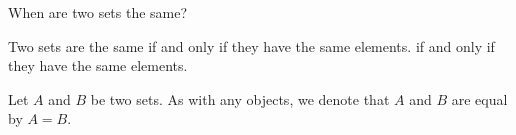 

When are two
sets the same?


Two sets are
the same if and only
if they have the same
elements.
if and only if
they have the same
elements.


Let $A$ and $B$ be
two sets.
As with any objects,
we denote that
$A$ and $B$
are equal
by $A = B$.
